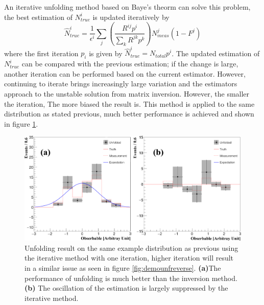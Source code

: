 \documentclass[12pt]{article}
\begin{document}
            \par An iterative unfolding method based on Baye's theorm\cite{DAgostini:1994fjx}\cite{DAgostini2010ImprovedIB} can solve this problem, 
            the best estimation of $N^i_{true}$ is updated iteratively by 
            $$\hat{N}^i_{true} = \frac{1}{\epsilon^i}\sum_{j}(\frac{R^{ij}p^i}{\sum_{k}R^{jk}p^k})N^j_{meas}(1-F^j)$$
            where the first iteration $p_i$ is given by $\hat{N}^i_{true}=N_{total}p^i$. The updated estimation of 
            $N^i_{true}$ can be compared with the previous estimation; if the change is large, another iteration can be performed 
            based on the current estimator. However, continuing to iterate brings increasingly large variation and the 
            estimators approach to the unstable solution from matrix inversion\cite{Cowan:2002in}. However, the smaller the iteration, 
            The more biased the result is. This method is applied to the same distribution as stated previous, 
            much better performance is achieved and shown in figure \ref{fig:demounfbayes}.
            \begin{figure}[ht]
                \begin{centering}
                \includegraphics[scale=0.23]{ps/unfold_demo_bayes.png}
                \caption{Unfolding result on the same example distribution as previous using the iterative method with one iteration, 
                higher iteration will result in a similar issue as seen in figure \ref{fig:demounfreverse}.
                \textbf{(a)}The performance of unfolding is much better than the inversion method. 
                \textbf{(b)} The oscillation of the estimation is largely suppressed by the iterative method.}
                \label{fig:demounfbayes}
                \end{centering}
            \end{figure}
\end{document}
